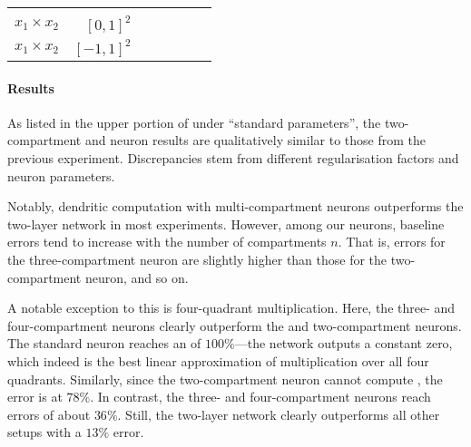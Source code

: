 \begin{table}
\begin{tabular}{r r r r r r r }
& \cellcolor{White!80!SteelBlue}{$5.0 \pm 0.4 \%$}
& \cellcolor{White!40!SteelBlue}{$23.1 \pm 1.2 \%$}
& \cellcolor{White!20!SteelBlue}{$25.3 \pm 1.2 \%$}
\\
$x_1 \times x_2$
& $[0, 1]^2$
& \cellcolor{White!20!SteelBlue}{$23.4 \pm 1.0 \%$}
& \cellcolor{White!80!SteelBlue}{$10.2 \pm 0.7 \%$}
& \cellcolor{White!100!SteelBlue}{$\mathbf{5.4 \pm 0.6 \%}$}
& \cellcolor{White!60!SteelBlue}{$11.0 \pm 0.7 \%$}
& \cellcolor{White!40!SteelBlue}{$11.3 \pm 0.9 \%$}
\\
$x_1 \times x_2$
& $[-1, 1]^2$
& \cellcolor{White!20!SteelBlue}{$103.4 \pm 2.1 \%$}
& \cellcolor{White!100!SteelBlue}{$\mathbf{11.4 \pm 1.5 \%}$}
& \cellcolor{White!40!SteelBlue}{$71.3 \pm 4.8 \%$}
& \cellcolor{White!60!SteelBlue}{$20.0 \pm 5.3 \%$}
& \cellcolor{White!80!SteelBlue}{$18.1 \pm 4.1 \%$}
\\
\bottomrule
\end{tabular}
\end{table}

\paragraph{Results}
As listed in the upper portion of  under \enquote{standard parameters}, the two-compartment and \LIF neuron results are qualitatively similar to those from the previous experiment.
Discrepancies stem from different regularisation factors and neuron parameters.

Notably, dendritic computation with multi-compartment neurons outperforms the two-layer network in most experiments.
However, among our \nlif neurons, baseline errors tend to increase with the number of compartments $n$.
That is, errors for the three-compartment neuron are slightly higher than those for the two-compartment neuron, and so on.

A notable exception to this is four-quadrant multiplication.
Here, the three- and four-compartment neurons clearly outperform the \LIF and two-compartment \LIF neurons.
The standard \LIF neuron reaches an \NRMSE of $100\%$---the network outputs a constant zero, which indeed is the best linear approximation of multiplication over all four quadrants.
Similarly, since the two-compartment \LIF neuron cannot compute \XOR, the error is at $78\%$.
In contrast, the three- and four-compartment neurons reach errors of about $36\%$.
Still, the two-layer network clearly outperforms all other setups with a $13\%$ error.

